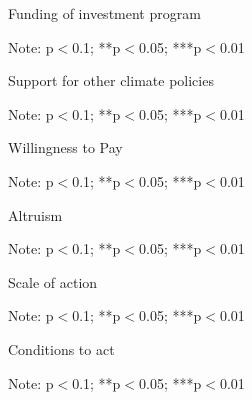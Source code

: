 \documentclass{article}
\begin{document}
\begin{table}[h!]
	\caption{Funding of investment program}
	\begin{center}
		\scalebox{0.7}{}
	\end{center}
	{\footnotesize Note: 
	\newline *p$<$0.1; **p$<$0.05; ***p$<$0.01}
\end{table}	

\begin{table}[h!]
	\caption{Support for other climate policies}
	\begin{center}
		\scalebox{0.7}{}
	\end{center}
	{\footnotesize Note: 
	\newline *p$<$0.1; **p$<$0.05; ***p$<$0.01}
\end{table}	

\begin{table}[h!]
	\caption{Willingness to Pay}
	\begin{center}
		\scalebox{0.7}{}
	\end{center}
	{\footnotesize Note: 
	\newline *p$<$0.1; **p$<$0.05; ***p$<$0.01}
\end{table}	

\begin{table}[h!]
	\caption{Altruism}
	\begin{center}
		\scalebox{0.7}{}
	\end{center}
	{\footnotesize Note: 
	\newline *p$<$0.1; **p$<$0.05; ***p$<$0.01}
\end{table}	

\begin{table}[h!]
	\caption{Scale of action}
	\begin{center}
		\scalebox{0.7}{}
	\end{center}
	{\footnotesize Note: 
	\newline *p$<$0.1; **p$<$0.05; ***p$<$0.01}
\end{table}	

\begin{table}[h!]
	\caption{Conditions to act}
	\begin{center}
		\scalebox{0.7}{}
	\end{center}
	{\footnotesize Note: 
	\newline *p$<$0.1; **p$<$0.05; ***p$<$0.01}
\end{table}	
\end{document}
